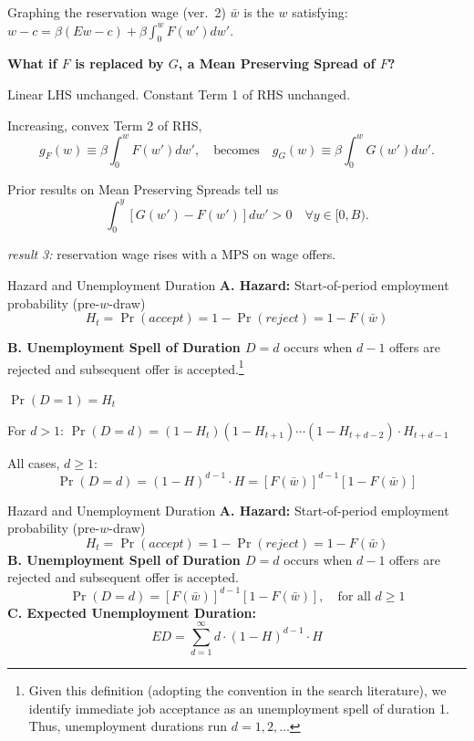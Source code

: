 \documentclass[aspectratio=169,xcolor=dvipsnames]{beamer}
\let\tempone\itemize
\let\temptwo\enditemize
\renewenvironment{itemize}{\tempone\addtolength{\itemsep}{\fill}}{\temptwo}
\begin{document}
\begin{frame}{Graphing the reservation wage (ver.\ 2)}
\label{slide:McCall_15}
\small
$\bar w$ is the $w$ satisfying: \quad $w-c=\beta(Ew-c)+\beta\int_0^{w}F(w')dw'$.

\vspace{0.5em}
\textbf{What if $F$ is replaced by $G$, a Mean Preserving Spread of $F$?}
\begin{itemize}
    \item Linear LHS unchanged. \quad Constant Term 1 of RHS unchanged.
    \item Increasing, convex Term 2 of RHS,
    \[
        g_F(w)\equiv \beta\int_0^{w}F(w')dw',
        \quad\text{becomes}\quad
        g_G(w)\equiv \beta\int_0^{w}G(w')dw'.
    \]
    \item Prior results on Mean Preserving Spreads tell us
    \[
        \int_0^{y}[G(w')-F(w')]dw' > 0
        \quad \forall y\in[0,B). \tag{5c}
    \]
    \item \emph{result 3:} reservation wage rises with a MPS on wage offers.
\end{itemize}
\end{frame}

\begin{frame}{Hazard and Unemployment Duration}
\label{slide:McCall_16}
\small
\textbf{A. Hazard:} Start-of-period employment probability (pre-$w$-draw)
\[
H_t=\Pr(accept)=1-\Pr(reject)=1-F(\bar w)
\]

\vspace{0.3em}
\textbf{B. Unemployment Spell of Duration $D=d$} occurs when $d-1$ offers are rejected and subsequent offer is accepted.\footnote{\scriptsize Given this definition (adopting the convention in the search literature), we identify immediate job acceptance as an unemployment spell of duration 1. Thus, unemployment durations run $d=1,2,\ldots$}

\vspace{0.2em}
\begin{itemize}
    \item $\Pr(D=1)=H_t$
    \item For $d>1$: $\Pr(D=d)=(1-H_t)(1-H_{t+1})\cdots(1-H_{t+d-2})\cdot H_{t+d-1}$
    \item All cases, $d\ge 1$:
    \[
        \Pr(D=d)=(1-H)^{d-1}\cdot H = [F(\bar w)]^{d-1}[1-F(\bar w)]
    \]
\end{itemize}
\end{frame}

\begin{frame}{Hazard and Unemployment Duration}
\label{slide:McCall_17}
\small
\textbf{A. Hazard:} Start-of-period employment probability (pre-$w$-draw)
\[
H_t=\Pr(accept)=1-\Pr(reject)=1-F(\bar w)
\]
\textbf{B. Unemployment Spell of Duration $D=d$} occurs when $d-1$ offers are rejected and subsequent offer is accepted.
\[
\Pr(D=d)=[F(\bar w)]^{d-1}[1-F(\bar w)],\quad \text{for all } d\ge 1
\]
\textbf{C. Expected Unemployment Duration:}
\[
ED=\sum_{d=1}^{\infty} d\cdot (1-H)^{d-1}\cdot H
\]
\end{frame}
\end{document}
